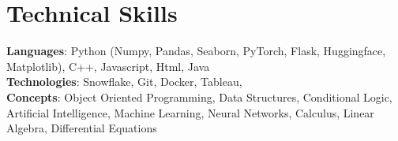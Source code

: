 \section{Technical Skills}
    \begin{itemize}[leftmargin=0.15in, label={}]
	\small{\item{
		\textbf{Languages}{: Python (Numpy, Pandas, Seaborn, PyTorch, Flask, Huggingface, Matplotlib), C++, Javascript, Html, Java} \\
		\textbf{Technologies}{: Snowflake, Git, Docker, Tableau, } \\
		\textbf{Concepts}{: Object Oriented Programming, Data Structures, Conditional Logic, Artificial Intelligence, Machine Learning, Neural Networks, Calculus, Linear Algebra, Differential Equations} \\
	}}
    \end{itemize}
